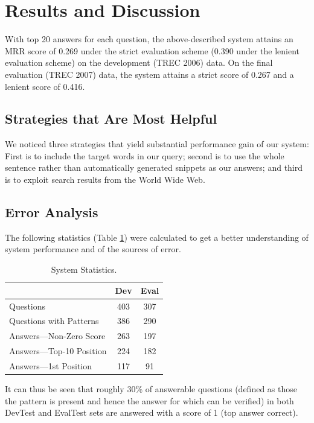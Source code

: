 \documentclass[11pt]{article}
\begin{document}
\section{Results and Discussion}
\label{sec:discussion}

With top 20 answers for each question, the above-described system attains an MRR score of 0.269 under the strict evaluation scheme (0.390 under the lenient evaluation scheme) on the development (TREC 2006) data. On the final evaluation (TREC 2007) data, the system attains a strict score of 0.267 and a lenient score of 0.416.

\subsection{Strategies that Are Most Helpful}
We noticed three strategies that yield substantial performance gain of our system: First is to include the target words in our query; second is to use the whole sentence rather than automatically generated snippets as our answers; and third is to exploit search results from the World Wide Web.

\subsection{Error Analysis}
The following statistics (Table \ref{stats}) were calculated to get a better understanding of system performance and of the sources of error. 

\begin{table}[h]
\begin{center}
\begin{tabular}{ |l |c |c| }
\hline
& Dev & Eval\\
\hline
Questions & 403 & 307\\
Questions with Patterns & 386 & 290\\
Answers---Non-Zero Score & 263 & 197\\
Answers---Top-10 Position & 224 & 182\\
Answers---1st Position & 117 & 91\\
\hline
\end{tabular}
\end{center}
\caption{\label{stats} System Statistics. 
}
\end{table}
It can thus be seen that roughly 30\% of answerable questions (defined as those the pattern is present and hence the answer for which can be verified) in both DevTest and EvalTest sets are answered with a score of 1 (top answer correct).
\end{document}
